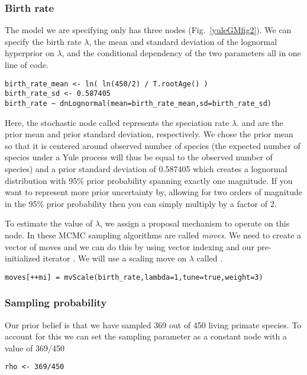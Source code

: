 \subsubsection{Birth rate}

The model we are specifying only has three nodes (Fig.~\ref{yuleGMfig2}). 
We can specify the birth rate $\lambda$, the mean and standard deviation of the lognormal hyperprior on $\lambda$, and the conditional dependency of the two parameters all in one line of \Rev code.
{\tt \begin{snugshade*}
\begin{lstlisting}
birth_rate_mean <- ln( ln(450/2) / T.rootAge() )
birth_rate_sd <- 0.587405
birth_rate ~ dnLognormal(mean=birth_rate_mean,sd=birth_rate_sd) 
\end{lstlisting}
\end{snugshade*}}
Here, the stochastic node called  represents the speciation rate $\lambda$.
 and  are the prior mean and prior standard deviation, respectively.
We chose the prior mean so that it is centered around observed number of species (\IE the expected number of species under a Yule process will thus be equal to the observed number of species) and a prior standard deviation of 0.587405 which creates a lognormal distribution with 95\% prior probability spanning exactly one magnitude.
If you want to represent more prior uncertainty by, \EG allowing for two orders of magnitude in the 95\% prior probability then you can simply multiply  by a factor of 2.

To estimate the value of $\lambda$, we assign a proposal mechanism to operate on this node. 
In \RevBayes these MCMC sampling algorithms are called \emph{moves}. 
We need to create a vector of moves and we can do this by using vector indexing and our pre-initialized iterator .
We will use a scaling move on $\lambda$ called .
{\tt \begin{snugshade*}
\begin{lstlisting}
moves[++mi] = mvScale(birth_rate,lambda=1,tune=true,weight=3)
\end{lstlisting}
\end{snugshade*}}

\subsubsection{Sampling probability}

Our prior belief is that we have sampled 369 out of 450 living primate species. 
To account for this we can set the sampling parameter as a constant node with a value of 369/450
{\tt \begin{snugshade*}
\begin{lstlisting}
rho <- 369/450
\end{lstlisting}
\end{snugshade*}}


